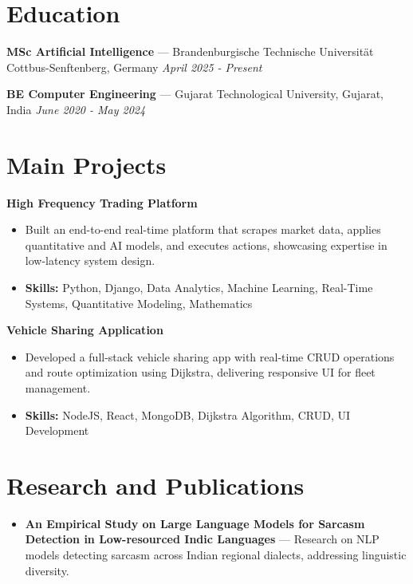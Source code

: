\documentclass[a4paper,10pt]{article}
\begin{document}
\section*{Education}
\textbf{MSc Artificial Intelligence} — Brandenburgische Technische Universität Cottbus-Senftenberg, Germany \hfill \textit{April 2025 - Present}\par
\vspace{1.5pt}
\textbf{BE Computer Engineering} — Gujarat Technological University, Gujarat, India \hfill \textit{June 2020 - May 2024}\par

\section*{Main Projects}
\textbf{High Frequency Trading Platform}\par
\vspace{1pt}
\begin{itemize}
  \item Built an end-to-end real-time platform that scrapes market data, applies quantitative and AI models, and executes actions, showcasing expertise in low-latency system design.
  \item \textbf{Skills:} Python, Django, Data Analytics, Machine Learning, Real-Time Systems, Quantitative Modeling, Mathematics
\end{itemize}
\vspace{3pt}
\textbf{Vehicle Sharing Application}\par
\vspace{1pt}
\begin{itemize}
  \item Developed a full-stack vehicle sharing app with real-time CRUD operations and route optimization using Dijkstra, delivering responsive UI for fleet management.
  \item \textbf{Skills:} NodeJS, React, MongoDB, Dijkstra Algorithm, CRUD, UI Development
\end{itemize}

\section*{Research and Publications}
\begin{itemize}
\item \textbf{An Empirical Study on Large Language Models for Sarcasm Detection in Low-resourced Indic Languages} — Research on NLP models detecting sarcasm across Indian regional dialects, addressing linguistic diversity.
\end{itemize}
\end{document}

